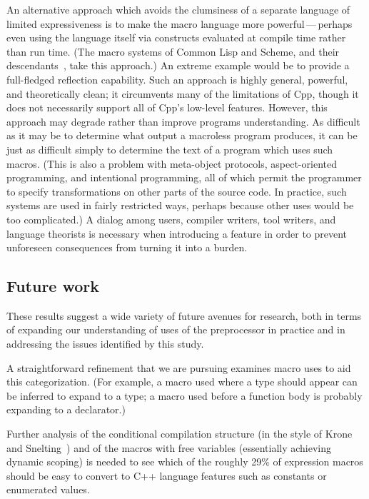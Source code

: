 \documentclass[10pt]{article}
\begin{document}
An alternative approach which avoids the clumsiness of a separate language
of limited expressiveness is to make the macro language more
powerful\,---\,perhaps even using the language itself via constructs
evaluated at compile time rather than run time.  (The macro systems of
Common Lisp and Scheme, and their descendants~\cite{WeiseC93}, take this
approach.)  An extreme example would be to provide a full-fledged
reflection capability.  Such an approach is highly general, powerful, and
theoretically clean; it circumvents many of the limitations of Cpp,
though it does not necessarily support all of Cpp's low-level features.
However, this approach may degrade rather than improve programs
understanding.  As difficult as it may be to determine what output a
macroless program produces, it can be just as difficult simply to determine
the text of a program which uses such macros.  (This is also a problem with
meta-object protocols, aspect-oriented programming, and intentional
programming, all of which permit the programmer to specify transformations
on other parts of the source code.  In practice, such systems are used in
fairly restricted ways, perhaps because other uses would be too
complicated.)  A dialog among users, compiler writers, tool writers, and
language theorists is necessary when introducing a feature in order to
prevent unforeseen consequences from turning it into a burden.


\subsection{Future work}
 
These results suggest a wide variety of future avenues for research, both
in terms of expanding our understanding of uses of the preprocessor in
practice and in addressing the issues identified by this study.

A straightforward refinement that we are pursuing examines macro uses to
aid this categorization.  (For example, a macro used where a type should
appear can be inferred to expand to a type; a macro used before a function
body is probably expanding to a declarator.)

Further analysis of the conditional
compilation structure (in the style of Krone and Snelting~\cite{Krone94})
and of the macros with free variables (essentially achieving dynamic
scoping) is needed to see which of the roughly 29\% of expression macros
should be easy to convert to C++ language features such as constants or
enumerated values.
\end{document}
